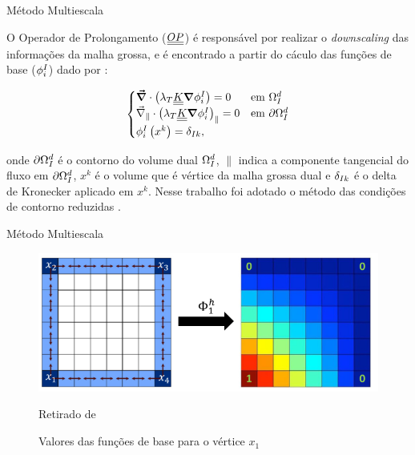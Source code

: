 \documentclass[professionalfont]{beamer}
\begin{document}
\begin{frame}{Método Multiescala}
    
    \small 
    O Operador de Prolongamento ($\underline{\underline{OP}}$) é responsável por realizar o \textit{downscaling} das informações da malha grossa, e é encontrado a partir do cáculo das funções de base ($\phi^{I}_{i}$) dado por \cite{Zhou2012, Wang2014}:

    \begin{equation}
        \label{eq:multiescala.1}
        \begin{cases}
            \mbox{\boldmath$ \vec{\nabla} $} \cdot \left( \lambda_{T} \underline{\underline{K}} \mbox{\boldmath$ \nabla $} \phi^{I}_{i} \right) = 0 & \text{em } \Omega_{I}^{d}\\
            \vec{\nabla}_{\parallel} \cdot \left( \lambda_{T} \underline{\underline{K}} \mbox{\boldmath$ \nabla $} \phi^{I}_{i} \right)_{\parallel} = 0 & \text{em } \partial \Omega_{I}^{d}\\
            \phi^{I}_{i} \left( x^{k}\right) = \delta_{Ik},
        \end{cases}
    \end{equation}

    onde $\partial \Omega_{I}^{d}$ é o contorno do volume dual $\Omega_{I}^{d}$, $\parallel$ indica a componente tangencial do fluxo em $\partial \Omega_{I}^{d}$, $x^{k}$ é o volume que é vértice da malha grossa dual e $\delta_{Ik}$ é o delta de Kronecker aplicado em $x^{k}$. Nesse trabalho foi adotado o método  das condições de contorno reduzidas \cite{Arthur_diss,Mazlumi_2021}.
\end{frame}

\begin{frame}{Método Multiescala}
    \begin{figure}[!ht]
        \caption{Valores das funções de base para o vértice $x_{1}$}
        \centering
        \includegraphics[scale=0.4]{./imgs/op_example.png}    
        \label{fig:operador_method.1}

        {\footnotesize Retirado de \cite{Hajibeygi_2020}}
    \end{figure}
\end{frame}
\end{document}
